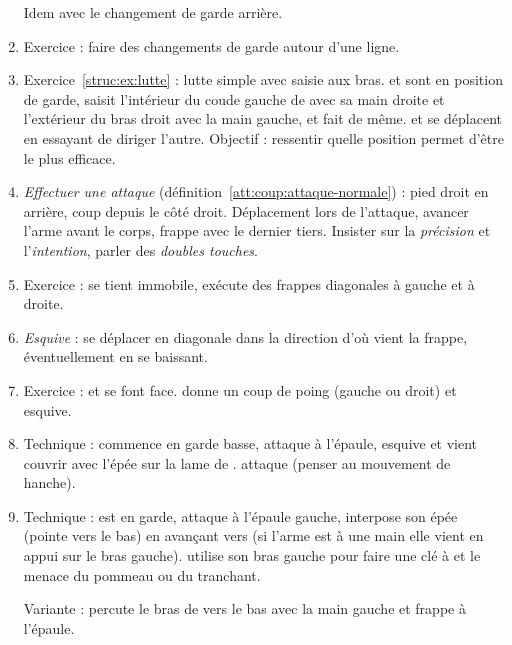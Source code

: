 \begin{enumerate}
	Idem avec le changement de garde arrière.
	
	\item Exercice : faire des changements de garde autour d'une ligne.
	
	\item Exercice~\ref{struc:ex:lutte} : lutte simple avec saisie aux bras.
	\A et \D sont en position de garde, \A saisit l'intérieur du coude gauche de \D avec sa main droite et l'extérieur du bras droit avec la main gauche, et \D fait de même.
	\A et \D se déplacent en essayant de diriger l'autre.
	Objectif : ressentir quelle position permet d'être le plus efficace.
	

	
	\item \emph{Effectuer une attaque} (définition~\ref{att:coup:attaque-normale}) : pied droit en arrière, coup depuis le côté droit.
	Déplacement lors de l'attaque, avancer l'arme avant le corps, frappe avec le dernier tiers.
	Insister sur la \emph{précision} et l'\emph{intention}, parler des \emph{doubles touches}.
	
	\item Exercice : \D se tient immobile, \A exécute des frappes diagonales à gauche et à droite.
	
	\item \emph{Esquive} : se déplacer en diagonale dans la direction d'où vient la frappe, éventuellement en se baissant.

	\item Exercice : \A et \D se font face.
		\A donne un coup de poing (gauche ou droit) et \D esquive.
	
	\item Technique : \D commence en garde basse, \A attaque à l'épaule, \D esquive et vient couvrir avec l'épée sur la lame de \A.
	\D attaque \A (penser au mouvement de hanche).
	
	\item Technique : \D est en garde, \A attaque à l'épaule gauche, \D interpose son épée (pointe vers le bas) en avançant vers \A (si l'arme est à une main elle vient en appui sur le bras gauche).
	\D utilise son bras gauche pour faire une clé à \A et le menace du pommeau ou du tranchant.
	
	Variante : \D percute le bras de \A vers le bas avec la main gauche et frappe à l'épaule.
	

\end{enumerate}

